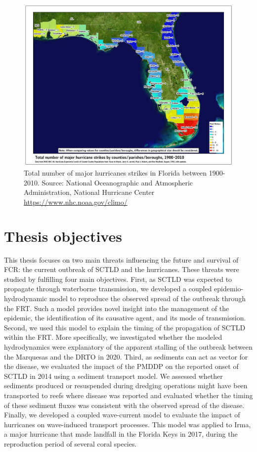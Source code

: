 \begin{figure}
    \centering
    \includegraphics[width=\textwidth]{chapters/intro/figures/hurricane_strikes.jpg}
    \caption{Total number of major hurricanes strikes in Florida between 1900-2010. Source: National Oceanographic and Atmospheric Administration, National Hurricane Center \url{https://www.nhc.noaa.gov/climo/}}
    \label{inro:landfall}
\end{figure}

\section{Thesis objectives}

This thesis focuses on two main threats influencing the future and survival of FCR: the current outbreak of SCTLD and the hurricanes. These threats were studied by fulfilling four main objectives. First, as SCTLD was expected to propagate through waterborne transmission, we developed a coupled epidemio-hydrodynamic model to reproduce the observed spread of the outbreak through the FRT. Such a model provides novel insight into the management of the epidemic, the identification of its causative agent, and its mode of transmission. Second, we used this model to explain the timing of the propagation of SCTLD within the FRT. More specifically, we investigated whether the modeled hydrodynamics were explanatory of the apparent stalling of the outbreak between the Marquesas and the DRTO in 2020. Third, as sediments can act as vector for the disease, we evaluated the impact of the PMDDP on the reported onset of SCTLD in 2014 using a sediment transport model. We assessed whether sediments produced or resuspended during dredging operations might have been transported to reefs where disease was reported and evaluated whether the timing of these sediment fluxes was consistent with the observed spread of the disease. Finally, we developed a coupled wave-current model to evaluate the impact of hurricanes on wave-induced transport processes. This model was applied to Irma, a major hurricane that made landfall in the Florida Keys in 2017, during the reproduction period of several coral species.

